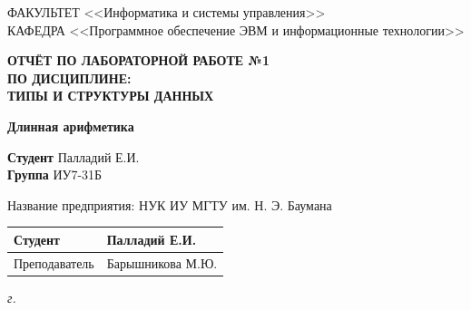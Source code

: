 \begin{titlepage}
	{
		\small \raggedright
		ФАКУЛЬТЕТ <<Информатика и системы управления>> \\
		\vspace{3.3mm}
		КАФЕДРА <<Программное обеспечение ЭВМ и информационные технологии>> \\
	}
	
	\vspace{20mm}
	
	{
		\LARGE \bfseries
		ОТЧЁТ ПО ЛАБОРАТОРНОЙ РАБОТЕ №1 \\
		ПО ДИСЦИПЛИНЕ: \\
		ТИПЫ И СТРУКТУРЫ ДАННЫХ\\
	}
	
	\vspace{5mm}
	
	{
		\Large \bfseries
		Длинная арифметика \\
	}
	
	\vspace{15mm}
	
	\begin{flushleft}
		\textbf{Студент} \uline{\hspace{5cm}} Палладий Е.И. \\
		\vspace{5mm}
		\textbf{Группа} \uline{\hspace{5cm}} ИУ7-31Б \\
	\end{flushleft}
	
	\vspace{40mm}
	
	\begin{flushleft}
		Название предприятия: НУК ИУ МГТУ им. Н. Э. Баумана \\
	\end{flushleft}
	
		
	\begin{flushleft}
		\begin{tabular}{|p{}|p{0.45\textwidth}|}
			\hline
			Студент & \uline{\hspace{3cm}} Палладий Е.И. \\
			\hline
			Преподаватель & \uline{\hspace{3cm}} Барышникова М.Ю. \\
			\hline
		\end{tabular}
	\end{flushleft}

	
	\textit{{\the\year} г.}
	
\end{titlepage}